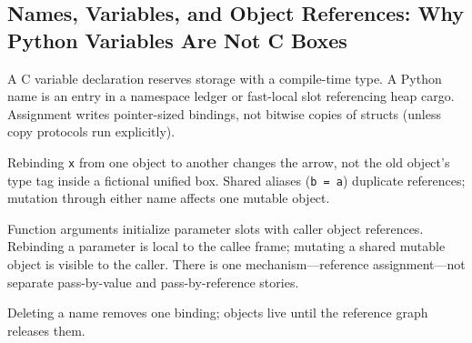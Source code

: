 \subsection{Names, Variables, and Object References: Why Python Variables Are Not C Boxes}

A C variable declaration reserves storage with a compile-time type. A Python name is an entry in a namespace ledger or fast-local slot referencing heap cargo. Assignment writes pointer-sized bindings, not bitwise copies of structs (unless copy protocols run explicitly).

Rebinding \texttt{x} from one object to another changes the arrow, not the old object's type tag inside a fictional unified box. Shared aliases (\texttt{b = a}) duplicate references; mutation through either name affects one mutable object.

Function arguments initialize parameter slots with caller object references. Rebinding a parameter is local to the callee frame; mutating a shared mutable object is visible to the caller. There is one mechanism---reference assignment---not separate pass-by-value and pass-by-reference stories.

Deleting a name removes one binding; objects live until the reference graph releases them.
